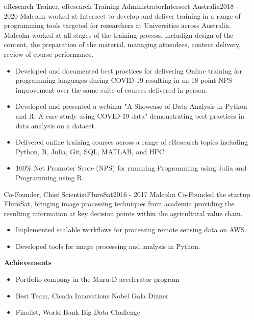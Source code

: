 \begin{cventry}{eResearch Trainer, eResearch Training Administrator}{Intersect Australia}{}{2018 - 2020}
  Malcolm worked at Intersect to develop and deliver training 
  in a range of programming tools
  targeted for researchers at Universities across Australia.
  Malcolm worked at all stages of the training process, 
  includign design of the content, 
  the preparation of the material, managing attendees, 
  content delivery, review of course performance.
  \begin{itemize}
    \item Developed and documented best practices for delivering Online
      training for programming languages during COVID-19 resulting in an
      18 point NPS improvement over the same suite of courses delivered in person.
    \item Developed and presented a webinar
      {"A Showcase of Data Analysis in Python and R: A case study using COVID-19 data"}
      demonstrating best practices in data analysis on a dataset.
    \item Delivered online training courses across a range of eResearch topics
      including Python, R, Julia, Git, SQL, MATLAB, and HPC.
    \item 100\% Net Promoter Score (NPS) for runnning Programming using Julia and Programming using R.
  \end{itemize}
\end{cventry}

\begin{cventry}{Co-Founder, Chief Scientist}{FluroSat}{}{2016 - 2017}
  Malcolm Co-Founded the startup FluroSat, 
  bringing image processing techniques from academia
  providing the resulting information at key decision points
  within the agricultural value chain.
  \begin{itemize}
    \item Implemented scalable workflows for processing remote sensing data on AWS.
    \item Developed tools for image processing and analysis in Python.
    \end{itemize}
  \textbf{Achievements}
  \begin{itemize}
      \item Portfolio company in the Muru-D accelerator program
      \item Best Team, Cicada Innovations Nobel Gala Dinner
      \item Finalist, World Bank Big Data Challenge
  \end{itemize}
\end{cventry}

